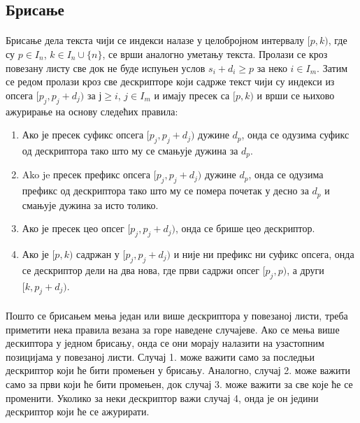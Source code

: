 \documentclass[12pt,oneside]{memoir}
\begin{document}
\subsection{Брисање}
\paragraph{}
Брисање дела текста чији се индекси налазе у целобројном интервалу \([p, k)\), где су 
\(p \in I_n\), \(k \in I_n \cup \{n\}\), се врши аналогно уметању текста. 
Пролази се кроз повезану листу све док не буде испуњен услов \(s_i + d_i \geq p\) за неко 
\(i \in I_m\). Затим се редом пролази кроз све дескрипторе који садрже текст чији су индекси из опсега \([p_j, p_j+d_j)\) за \(ј \geq i\), \(j \in I_m\) и имају пресек са
\([p, k)\) и врши се њихово ажурирање на основу следећих правила:

\begin{enumerate}
	\item Ако је пресек суфикс опсега \([p_j, p_j+d_j)\) дужине \(d_p\), онда се одузима суфикс 
	од дескриптора тако што му се смањује дужина за \(d_p\).
	
	\item Ako je пресек префикс опсега \([p_j, p_j+d_j)\) дужине \(d_p\), онда се одузима префикс
	 од дескриптора тако што му се помера почетак у десно за \(d_p\) и смањује дужина за исто
	 толико.
	 
	\item Ако је пресек цео опсег \([p_j, p_j+d_j)\), онда се брише цео дескриптор.
	 
	\item Ако је \([p, k)\) садржан у \([p_j, p_j+d_j)\) и није ни префикс ни суфикс опсега,
	онда се дескриптор дели на два нова, где први садржи опсег \([p_j, p)\), а други 
	\([k, p_j+d_j)\).
\end{enumerate}
\paragraph{}
Пошто се брисањем мења један или више дескриптора у повезаној листи, треба
приметити нека правила везана за горе наведене случајеве. Ако се мења више дескиптора
у једном брисању, онда се они морају налазити на узастопним позицијама у повезаној листи.
Случај 1. може важити само за последњи дескриптор који ће бити промењен у брисању.
Аналогно, случај 2. може важити само за први који ће бити промењен, док случај 3. 
може важити за све које ће се променити. Уколико за неки дескриптор важи случај 4, 
онда је он једини дескриптор који ће се ажурирати.
\end{document}
